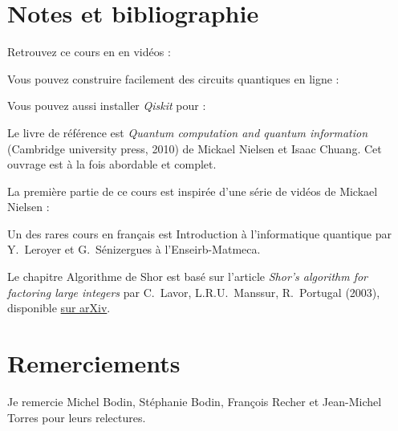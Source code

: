 
\clearemptydoublepage
\pagestyle{empty}\thispagestyle{empty}

\vspace*{\fill}

\section*{Notes et bibliographie}

Retrouvez ce cours en en vidéos : 

\medskip

Vous pouvez construire facilement des circuits quantiques en ligne :

Vous pouvez aussi installer \emph{Qiskit} pour \Python{}:

\medskip

Le livre de référence est \emph{Quantum computation and quantum information} (Cambridge university press, 2010) de Mickael Nielsen et Isaac Chuang. Cet ouvrage est à la fois abordable et complet.

\medskip

La première partie de ce cours est inspirée d'une série de vidéos de Mickael Nielsen :

\medskip

Un des rares cours en français est \og{}Introduction à l'informatique quantique\fg{} par Y.~Leroyer et G.~Sénizergues
à l'Enseirb-Matmeca.

\medskip

Le chapitre \og{}Algorithme de Shor\fg{} est basé sur l'article \emph{Shor's algorithm for factoring large integers} par C.~Lavor, L.R.U.~Manssur, R.~Portugal (2003), disponible \href{https://arxiv.org/abs/quant-ph/0303175}{sur arXiv}.


\section*{Remerciements}

Je remercie Michel Bodin, Stéphanie Bodin, François Recher et Jean-Michel Torres pour leurs relectures.






